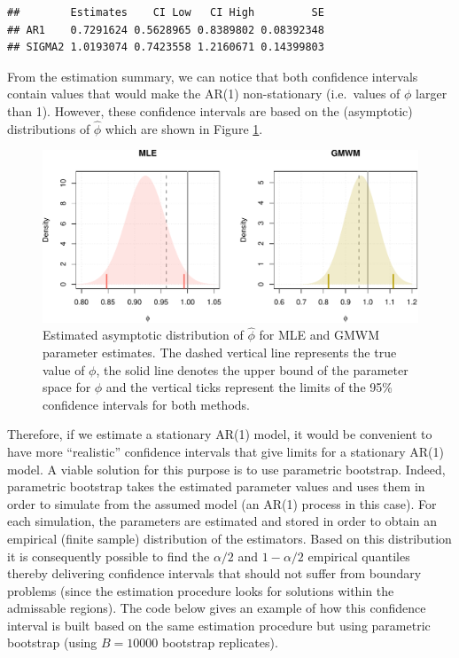 \documentclass[]{book}
\theoremstyle{definition}
\theoremstyle{definition}
\theoremstyle{definition}
\theoremstyle{remark}
\begin{document}
\begin{verbatim}
##        Estimates    CI Low   CI High         SE
## AR1    0.7291624 0.5628965 0.8389802 0.08392348
## SIGMA2 1.0193074 0.7423558 1.2160671 0.14399803
\end{verbatim}

From the estimation summary, we can notice that both confidence
intervals contain values that would make the AR(1) non-stationary
(i.e.~values of \(\phi\) larger than 1). However, these confidence
intervals are based on the (asymptotic) distributions of \(\hat{\phi}\)
which are shown in Figure \ref{fig:asymIC}.

\begin{figure}
\centering
\includegraphics{ts_files/figure-latex/asymIC-1.pdf}
\caption{\label{fig:asymIC}Estimated asymptotic distribution of
\(\hat{\phi}\) for MLE and GMWM parameter estimates. The dashed vertical
line represents the true value of \(\phi\), the solid line denotes the
upper bound of the parameter space for \(\phi\) and the vertical ticks
represent the limits of the 95\% confidence intervals for both methods.}
\end{figure}

Therefore, if we estimate a stationary AR(1) model, it would be
convenient to have more ``realistic'' confidence intervals that give
limits for a stationary AR(1) model. A viable solution for this purpose
is to use parametric bootstrap. Indeed, parametric bootstrap takes the
estimated parameter values and uses them in order to simulate from the
assumed model (an AR(1) process in this case). For each simulation, the
parameters are estimated and stored in order to obtain an empirical
(finite sample) distribution of the estimators. Based on this
distribution it is consequently possible to find the \(\alpha/2\) and
\(1-\alpha/2\) empirical quantiles thereby delivering confidence
intervals that should not suffer from boundary problems (since the
estimation procedure looks for solutions within the admissable regions).
The code below gives an example of how this confidence interval is built
based on the same estimation procedure but using parametric bootstrap
(using \(B = 10000\) bootstrap replicates).
\end{document}
